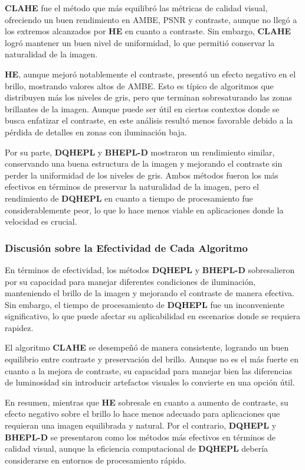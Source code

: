 \documentclass[sigchi]{acmart}
\begin{document}
\textbf{CLAHE} fue el método que más equilibró las métricas de calidad visual, ofreciendo un
buen rendimiento en AMBE, PSNR y contraste, aunque no llegó a los extremos alcanzados por
\textbf{HE} en cuanto a contraste. Sin embargo, \textbf{CLAHE} logró mantener un buen nivel de
uniformidad, lo que permitió conservar la naturalidad de la imagen.

\textbf{HE}, aunque mejoró notablemente el contraste, presentó un efecto negativo en el brillo,
mostrando valores altos de AMBE. Esto es típico de algoritmos que distribuyen más los niveles
de gris, pero que terminan sobresaturando las zonas brillantes de la imagen. Aunque puede ser
útil en ciertos contextos donde se busca enfatizar el contraste, en este análisis resultó menos
favorable debido a la pérdida de detalles en zonas con iluminación baja.

Por su parte, \textbf{DQHEPL} y \textbf{BHEPL-D} mostraron un rendimiento similar, conservando
una buena estructura de la imagen y mejorando el contraste sin perder la uniformidad de los
niveles de gris. Ambos métodos fueron los más efectivos en términos de preservar la naturalidad
de la imagen, pero el rendimiento de \textbf{DQHEPL} en cuanto a tiempo de procesamiento fue
considerablemente peor, lo que lo hace menos viable en aplicaciones donde la velocidad es
crucial.

\subsubsection{Discusión sobre la Efectividad de Cada Algoritmo}

En términos de efectividad, los métodos \textbf{DQHEPL} y \textbf{BHEPL-D} sobresalieron por su
capacidad para manejar diferentes condiciones de iluminación, manteniendo el brillo de la
imagen y mejorando el contraste de manera efectiva. Sin embargo, el tiempo de procesamiento de
\textbf{DQHEPL} fue un inconveniente significativo, lo que puede afectar su aplicabilidad en
escenarios donde se requiera rapidez.

El algoritmo \textbf{CLAHE} se desempeñó de manera consistente, logrando un buen equilibrio
entre contraste y preservación del brillo. Aunque no es el más fuerte en cuanto a la mejora de
contraste, su capacidad para manejar bien las diferencias de luminosidad sin introducir
artefactos visuales lo convierte en una opción útil.

En resumen, mientras que \textbf{HE} sobresale en cuanto a aumento de contraste, su efecto
negativo sobre el brillo lo hace menos adecuado para aplicaciones que requieran una imagen
equilibrada y natural. Por el contrario, \textbf{DQHEPL} y \textbf{BHEPL-D} se presentaron como
los métodos más efectivos en términos de calidad visual, aunque la eficiencia computacional de
\textbf{DQHEPL} debería considerarse en entornos de procesamiento rápido.
\end{document}
